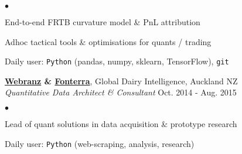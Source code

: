 \documentclass[margin, line]{res}
\newcommand{\algo}{https://twitter.com/flipdazed}
\newcommand{\Webranz}{http://webranz.com}
\newcommand{\Fonterra}{https://www.fonterra.com/nz/en/About/Global+Dairy+Trade} %
\newenvironment{list2}{
	\begin{list}{$\bullet$}{%
		\setlength{\itemsep}{0in}
		\setlength{\parsep}{0in} \setlength{\parskip}{0in}
		\setlength{\topsep}{0in} \setlength{\partopsep}{0in}
		\setlength{\leftmargin}{0.2in}}}{\end{list}}
\begin{document}
\begin{resume}
\begin{list2}
\item End-to-end FRTB curvature model \& PnL attribution
\item Adhoc tactical tools \& optimisations for quants / trading
\item Daily user: \verb|Python| (pandas, numpy, sklearn, TensorFlow), \verb|git|
\end{list2}

{\bf \href{\Webranz}{Webranz} \& \href{\Fonterra}{Fonterra}},
	Global Dairy Intelligence, Auckland NZ \\
\vspace{-.3cm}
{\em Quantitative Data Architect \& Consultant}
	\hfill{ Oct. 2014 - Aug. 2015}\\

\begin{list2}
    \item Lead of quant solutions in data acquisition
    \& prototype research
    \item Daily user: \verb|Python| (web-scraping, analysis, research)
\end{list2}


\end{resume}
\end{document}
